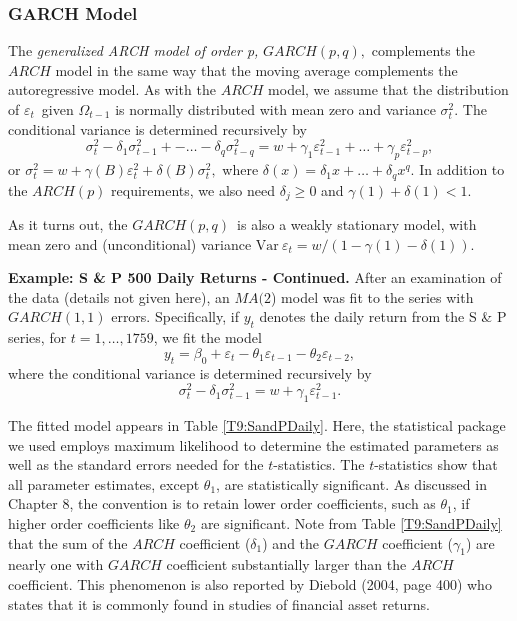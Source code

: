 \subsubsection*{GARCH Model}

The \emph{generalized ARCH model of order p,} $GARCH(p,q),$
complements the $ ARCH$ model in the same way that the moving
average complements the autoregressive model. As with the $ARCH$
model, we assume that the distribution of $\varepsilon_t$\ given
$\Omega_{t-1}$ is normally distributed with mean zero and variance
$\sigma_t^2$. The conditional variance is determined recursively by
\begin{equation*}
\sigma_t^2-\delta_1\sigma_{t-1}^2+-\ldots-\delta_{q}\sigma
_{t-q}^2=w+\gamma_1\varepsilon_{t-1}^2+\ldots+\gamma_{p}\varepsilon
_{t-p}^2,
\end{equation*}
or $\sigma_t^2=w+\gamma (B)\varepsilon_t^2+\delta (B)\sigma_t^2,$
where $\delta (x)=\delta_1x+\ldots+\delta_{q}x^{q}.$ In addition to
the $ARCH(p)$ requirements, we also need $\delta_{j}\geq 0$ and
$\gamma (1)+\delta \left( 1\right) <1$.

As it turns out, the $GARCH(p,q)$\ is also a weakly stationary
model, with mean zero and (unconditional) variance
$\mathrm{Var~}\varepsilon_t=w/(1-\gamma (1)-\delta \left( 1\right)
).$

\linejed{}

\textbf{Example: S \& P 500 Daily Returns - Continued. }After an
examination of the data (details not given here), an $MA(2$) model
was fit to the series with $GARCH(1,1)$ errors. Specifically, if
$y_t$ denotes the daily return from the S \& P series, for
$t=1,\ldots,1759$, we fit the model
\begin{equation*}
y_t = \beta_0 + \varepsilon_t - \theta_1 \varepsilon_{t-1} -
\theta_2 \varepsilon_{t-2},
\end{equation*}
where the conditional variance is determined recursively by
\begin{equation*}
\sigma_t^2 - \delta_1 \sigma_{t-1}^2 = w + \gamma_1
\varepsilon_{t-1}^2.
\end{equation*}

The fitted model appears in Table \ref{T9:SandPDaily}. Here, the
statistical package we used employs maximum likelihood to determine
the estimated parameters as well as the standard errors needed for
the $t$-statistics. The $t$-statistics show that all parameter
estimates, except $\theta_1$, are statistically significant. As
discussed in Chapter 8, the convention is to retain lower order
coefficients, such as $\theta_1$, if higher order coefficients like
$\theta_2$ are significant. Note from Table \ref{T9:SandPDaily} that
the sum of the $ARCH$ coefficient ($\delta_1$) and the $GARCH$
coefficient ($\gamma_1$) are nearly one with $GARCH$ coefficient
substantially larger than the $ARCH$ coefficient. This phenomenon is
also reported by Diebold (2004, page 400) who states that it is
commonly found in studies of financial asset returns.

